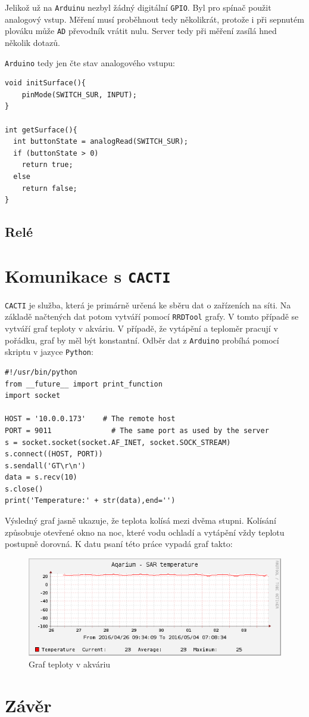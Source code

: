 \documentclass[a4paper,10pt]{article}
\newcommand{\ttt}[1]{\texttt{#1}}
\begin{document}
Jelikož už na \ttt{Arduinu} nezbyl žádný digitální \ttt{GPIO}. Byl pro spínač použit analogový vstup. Měření musí proběhnout tedy několikrát, protože i při sepnutém plováku může \ttt{AD} převodník vrátit nulu. Server tedy při měření zasílá hned několik dotazů.

\ttt{Arduino} tedy jen čte stav analogového vstupu:

\begin{verbatim}
void initSurface(){
	pinMode(SWITCH_SUR, INPUT);
}

int getSurface(){
  int buttonState = analogRead(SWITCH_SUR);
  if (buttonState > 0)
    return true;
  else
    return false;
}
\end{verbatim}

\subsection{Relé}


\section{Komunikace s \ttt{CACTI}}

\ttt{CACTI} je služba, která je primárně určená ke sběru dat o zařízeních na síti. Na základě načtených dat potom vytváří pomocí \ttt{RRDTool} grafy. V tomto případě se vytváří graf teploty v akváriu. V případě, že vytápění a teploměr pracují v pořádku, graf by měl být konstantní. Odběr dat z \ttt{Arduino} probíhá pomocí skriptu v jazyce \ttt{Python}:

\begin{verbatim}
#!/usr/bin/python
from __future__ import print_function
import socket

HOST = '10.0.0.173'    # The remote host
PORT = 9011              # The same port as used by the server
s = socket.socket(socket.AF_INET, socket.SOCK_STREAM)
s.connect((HOST, PORT))
s.sendall('GT\r\n')
data = s.recv(10)
s.close()
print('Temperature:' + str(data),end='')
\end{verbatim}

Výsledný graf jasně ukazuje, že teplota kolísá mezi dvěma stupni. Kolísání způsobuje otevřené okno na noc, které vodu ochladí a vytápění vždy teplotu postupně dorovná. K datu psaní této práce vypadá graf takto:


\begin{figure}[H]
  \centering
    \includegraphics[width=1\textwidth]{graph.png}
  \caption{Graf teploty v akváriu}
  \label{char:temps}
\end{figure}


\section{Závěr}



\end{document}
